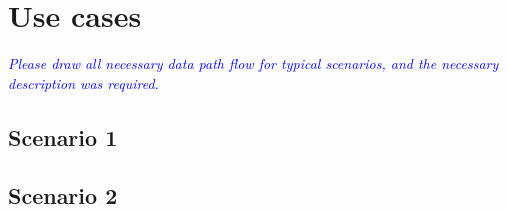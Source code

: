 
\clearpage

\section{Use cases}
\noindent\textit{\small\textcolor{blue}{Please draw all necessary data path flow for typical scenarios, and the necessary description was required.}}

\subsection{Scenario 1}
\subsection{Scenario 2}
